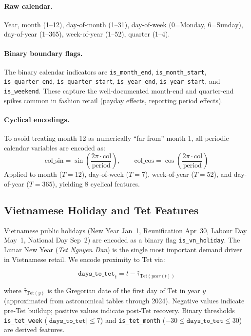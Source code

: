 \documentclass{article}
\begin{document}
\paragraph{Raw calendar.}
Year, month (1--12), day-of-month (1--31), day-of-week (0=Monday, 6=Sunday),
day-of-year (1--365), week-of-year (1--52), quarter (1--4).

\paragraph{Binary boundary flags.}
The binary calendar indicators are \texttt{is\_month\_end},
\texttt{is\_month\_start}, \texttt{is\_quarter\_end},
\texttt{is\_quarter\_start}, \texttt{is\_year\_end},
\texttt{is\_year\_start}, and \texttt{is\_weekend}.
These capture the well-documented month-end and quarter-end spikes common
in fashion retail (payday effects, reporting period effects).

\paragraph{Cyclical encodings.}
To avoid treating month 12 as numerically ``far from'' month 1, all periodic
calendar variables are encoded as:
\begin{equation}
  \text{col\_sin} = \sin\!\left(\frac{2\pi \cdot \text{col}}{\text{period}}\right),
  \qquad
  \text{col\_cos} = \cos\!\left(\frac{2\pi \cdot \text{col}}{\text{period}}\right)
\end{equation}
Applied to month ($T=12$), day-of-week ($T=7$), week-of-year ($T=52$), and
day-of-year ($T=365$), yielding 8 cyclical features.

\subsection{Vietnamese Holiday and Tet Features}

Vietnamese public holidays (New Year Jan~1, Reunification Apr~30, Labour Day
May~1, National Day Sep~2) are encoded as a binary flag
\texttt{is\_vn\_holiday}.
The Lunar New Year (\textit{Tet Nguyen Dan}) is the single most important
demand driver in Vietnamese retail.
We encode proximity to Tet via:

\begin{equation}
  \texttt{days\_to\_tet}_t = t - \hat{\tau}_{\text{Tet}(year(t))}
\end{equation}

where $\hat{\tau}_{\text{Tet}(y)}$ is the Gregorian date of the first day of
Tet in year $y$ (approximated from astronomical tables through 2024).
Negative values indicate pre-Tet buildup; positive values indicate post-Tet
recovery.
Binary thresholds \texttt{is\_tet\_week} ($|\texttt{days\_to\_tet}| \le 7$)
and \texttt{is\_tet\_month} ($-30 \le \texttt{days\_to\_tet} \le 30$) are
derived features.
\end{document}
